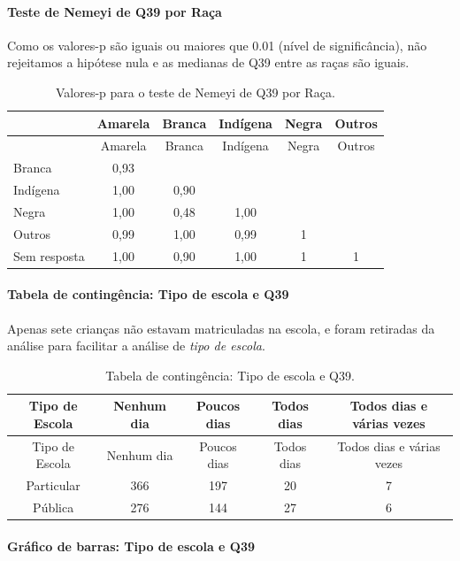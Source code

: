 \documentclass[]{article}
\let\oldparagraph\paragraph
\renewcommand{\paragraph}[1]{\oldparagraph{#1}\mbox{}}
\begin{document}
\hypertarget{teste-de-nemeyi-de-q39-por-rauxe7a}{%
\paragraph{Teste de Nemeyi de Q39 por Raça}\label{teste-de-nemeyi-de-q39-por-rauxe7a}}

Como os valores-p são iguais ou maiores que 0.01 (nível de significância), não rejeitamos a hipótese nula e as medianas de Q39 entre as raças são iguais.

\begin{longtable}[]{@{}lccccc@{}}
\caption{\label{tab:unnamed-chunk-1527}Valores-p para o teste de Nemeyi de Q39 por Raça.}\tabularnewline
\toprule
& Amarela & Branca & Indígena & Negra & Outros\tabularnewline
\midrule
\endfirsthead
\toprule
& Amarela & Branca & Indígena & Negra & Outros\tabularnewline
\midrule
\endhead
Branca & 0,93 & & & &\tabularnewline
Indígena & 1,00 & 0,90 & & &\tabularnewline
Negra & 1,00 & 0,48 & 1,00 & &\tabularnewline
Outros & 0,99 & 1,00 & 0,99 & 1 &\tabularnewline
Sem resposta & 1,00 & 0,90 & 1,00 & 1 & 1\tabularnewline
\bottomrule
\end{longtable}

\cleardoublepage

\hypertarget{tabela-de-continguxeancia-tipo-de-escola-e-q39}{%
\paragraph{Tabela de contingência: Tipo de escola e Q39}\label{tabela-de-continguxeancia-tipo-de-escola-e-q39}}

Apenas sete crianças não estavam matriculadas na escola, e foram retiradas da análise para facilitar a análise de \emph{tipo de escola}.

\begin{longtable}[]{@{}ccccc@{}}
\caption{\label{tab:unnamed-chunk-1528}Tabela de contingência: Tipo de escola e Q39.}\tabularnewline
\toprule
Tipo de Escola & Nenhum dia & Poucos dias & Todos dias & Todos dias e várias vezes\tabularnewline
\midrule
\endfirsthead
\toprule
Tipo de Escola & Nenhum dia & Poucos dias & Todos dias & Todos dias e várias vezes\tabularnewline
\midrule
\endhead
Particular & 366 & 197 & 20 & 7\tabularnewline
Pública & 276 & 144 & 27 & 6\tabularnewline
\bottomrule
\end{longtable}

\hypertarget{gruxe1fico-de-barras-tipo-de-escola-e-q39}{%
\paragraph{Gráfico de barras: Tipo de escola e Q39}\label{gruxe1fico-de-barras-tipo-de-escola-e-q39}}
\end{document}
